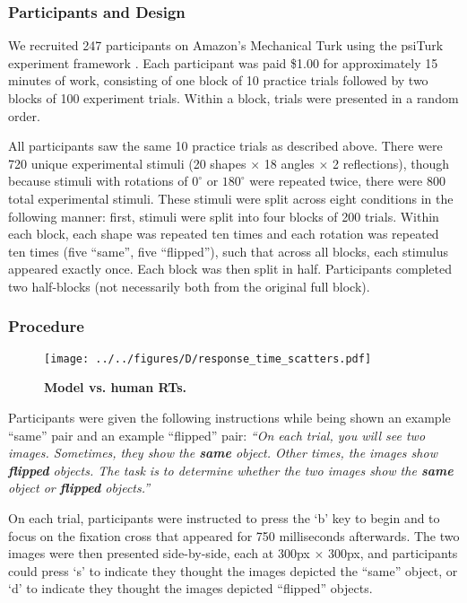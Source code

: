 \documentclass[10pt,letterpaper]{article}
\begin{document}
\subsubsection{Participants and Design}

We recruited 247 participants on Amazon's Mechanical Turk using the
psiTurk experiment framework \cite{Mcdonnell12}. Each participant was
paid \$1.00 for approximately 15 minutes of work, consisting of one
block of 10 practice trials followed by two blocks of 100 experiment
trials. Within a block, trials were presented in a random order.

All participants saw the same 10 practice trials as described
above. There were 720 unique experimental stimuli (20 shapes $\times$
18 angles $\times$ 2 reflections), though because stimuli with
rotations of $0^\circ$ or $180^\circ$ were repeated twice, there were
800 total experimental stimuli. These stimuli were split across eight
conditions in the following manner: first, stimuli were split into
four blocks of 200 trials. Within each block, each shape was repeated
ten times and each rotation was repeated ten times (five ``same'',
five ``flipped''), such that across all blocks, each stimulus appeared
exactly once. Each block was then split in half. Participants
completed two half-blocks (not necessarily both from the original full
block).

\subsubsection{Procedure}

\begin{figure*}[t]
  \begin{center}
    \texttt{[image: ../../figures/D/response\_time\_scatters.pdf]}
    \caption{\textbf{Model vs. human RTs.}}
    \label{fig:human-model-scatters}
  \end{center}
\end{figure*}

Participants were given the following instructions while being shown
an example ``same'' pair and an example ``flipped'' pair: \textit{``On
  each trial, you will see two images. Sometimes, they show the
  \textbf{same} object. Other times, the images show \textbf{flipped}
  objects. The task is to determine whether the two images show the
  \textbf{same} object or \textbf{flipped} objects.''}

On each trial, participants were instructed to press the `b' key to
begin and to focus on the fixation cross that appeared for 750
milliseconds afterwards. The two images were then presented
side-by-side, each at 300px $\times$ 300px, and participants could
press `s' to indicate they thought the images depicted the ``same''
object, or `d' to indicate they thought the images depicted
``flipped'' objects.
\end{document}
